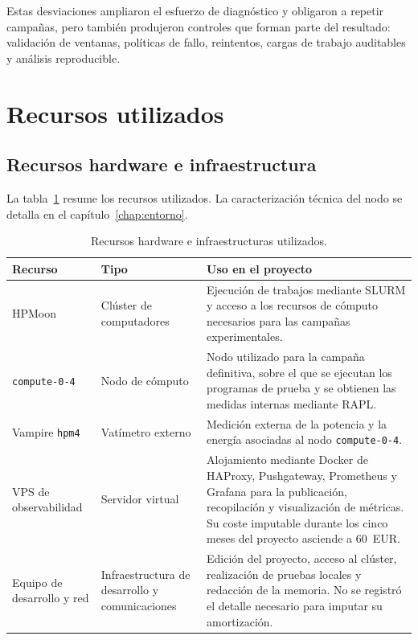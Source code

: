 Estas desviaciones ampliaron el esfuerzo de diagnóstico y obligaron a repetir campañas, pero también produjeron controles que forman parte del resultado: validación de ventanas, políticas de fallo, reintentos, cargas de trabajo auditables y análisis reproducible.

\section{Recursos utilizados}
\label{sec:planificacion-recursos}

\subsection{Recursos hardware e infraestructura}
\label{subsec:recursos-hardware}

La tabla~\ref{tab:recursos-hardware} resume los recursos utilizados. La caracterización técnica del nodo se detalla en el capítulo~\ref{chap:entorno}.

\begin{table}[htbp]
    \centering
    \small
    \caption{Recursos hardware e infraestructuras utilizados.}
    \label{tab:recursos-hardware}
    \begin{tabular}{p{}p{}p{}}
        \hline
        Recurso & Tipo & Uso en el proyecto \\
        \hline
        HPMoon &
        Clúster de computadores &
        Ejecución de trabajos mediante SLURM y acceso a los recursos de cómputo necesarios para las campañas experimentales. \\

        \texttt{compute-0-4} &
        Nodo de cómputo &
        Nodo utilizado para la campaña definitiva, sobre el que se ejecutan los programas de prueba y se obtienen las medidas internas mediante RAPL. \\

        Vampire \texttt{hpm4} &
        Vatímetro externo &
        Medición externa de la potencia y la energía asociadas al nodo \texttt{compute-0-4}. \\

        VPS de observabilidad &
        Servidor virtual &
        Alojamiento mediante Docker de HAProxy, Pushgateway, Prometheus y Grafana para la publicación, recopilación y visualización de métricas. Su coste imputable durante los cinco meses del proyecto asciende a 60~EUR. \\

        Equipo de desarrollo y red &
        Infraestructura de desarrollo y comunicaciones &
        Edición del proyecto, acceso al clúster, realización de pruebas locales y redacción de la memoria. No se registró el detalle necesario para imputar su amortización. \\
        \hline
    \end{tabular}
\end{table}

